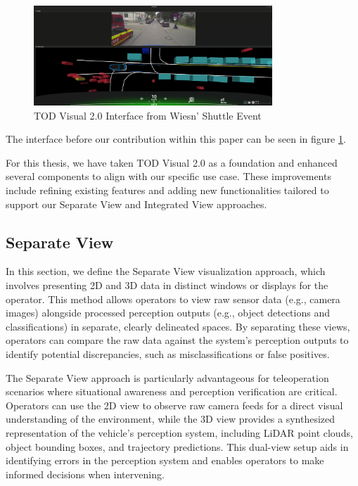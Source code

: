 \begin{figure}
    \includegraphics[width=0.8\textwidth]{figures/tod_visual.png}
    \centering
    \caption{TOD Visual 2.0 Interface from Wiesn' Shuttle Event}
    \label{fig:TODVisual}
\end{figure}

The interface before our contribution within this paper can be seen in figure \ref{fig:TODVisual}.

For this thesis, we have taken TOD Visual 2.0 as a foundation and enhanced several components to align with our specific use case. These improvements include refining existing features and adding new functionalities tailored to support our Separate View and Integrated View approaches.


\subsection{Separate View}\label{section:separateview}
In this section, we define the Separate View visualization approach, which involves presenting 2D and 3D data in distinct windows or displays for the operator. This method allows operators to view raw sensor data (e.g., camera images) alongside processed perception outputs (e.g., object detections and classifications) in separate, clearly delineated spaces. By separating these views, operators can compare the raw data against the system's perception outputs to identify potential discrepancies, such as misclassifications or false positives.

The Separate View approach is particularly advantageous for teleoperation scenarios where situational awareness and perception verification are critical. Operators can use the 2D view to observe raw camera feeds for a direct visual understanding of the environment, while the 3D view provides a synthesized representation of the vehicle's perception system, including LiDAR point clouds, object bounding boxes, and trajectory predictions. This dual-view setup aids in identifying errors in the perception system and enables operators to make informed decisions when intervening.
